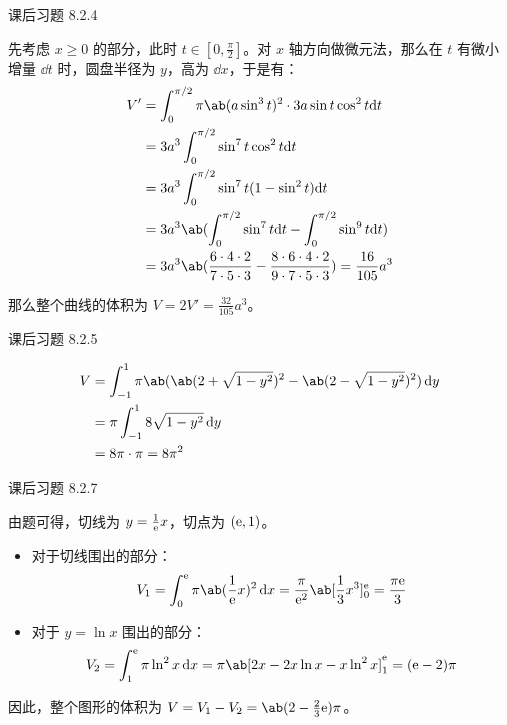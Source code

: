 \begin{problem}
	课后习题 8.2.4

	\begin{solution}
		先考虑 $x \ge 0$ 的部分，此时 $t \in [0, \frac{\pi}{2}]$。对 $x$ 轴方向做微元法，那么在 $t$ 有微小增量 $\dd t$ 时，圆盘半径为 $y$，高为 $\dd x$，于是有：
		$$
		\begin{aligned}
			V' & = \int_0^{\pi/2} \pi \ab(a \sin^3 t)^2 \cdot 3a \sin t \cos^2 t \dd t \\
			& = 3a^3 \int_0^{\pi/2} \sin^7 t \cos^2 t \dd t \\
			& = 3a^3 \int_0^{\pi/2} \sin^7 t (1 - \sin^2 t) \dd t \\
			& = 3a^3 \ab(\int_0^{\pi/2} \sin^7 t \dd t - \int_0^{\pi/2} \sin^9 t \dd t) \\
			& = 3a^3 \ab(\frac{6 \cdot 4 \cdot 2}{7 \cdot 5 \cdot 3} - \frac{8 \cdot 6 \cdot 4 \cdot 2}{9 \cdot 7 \cdot 5 \cdot 3}) = \frac{16}{105} a^3
		\end{aligned}
		$$

		那么整个曲线的体积为 $V = 2V' = \frac{32}{105} a^3$。
	\end{solution}
\end{problem}

\begin{problem}
	课后习题 8.2.5

	\begin{solution}
		$$
		\begin{aligned}
			V & = \int_{-1}^1 \pi \ab(\ab(2 + \sqrt{1 - y^2})^2 - \ab(2 - \sqrt{1 - y^2})^2) \dd{y} \\
			& = \pi \int_{-1}^1 8 \sqrt{1 - y^2} \dd{y} \\
			& = 8 \pi \cdot \pi = 8\pi^2
		\end{aligned}
		$$
	\end{solution}
\end{problem}

\begin{problem}
	课后习题 8.2.7

	\begin{solution}
		由题可得，切线为 $y = \frac{1}{\mathrm{e}} x$，切点为 $(\mathrm{e}, 1)$。

		\begin{itemize}
			\item 对于切线围出的部分：
			$$
			V_1 = \int_0^\E \pi \ab(\frac{1}{\E} x)^2 \dd{x} = \frac{\pi}{\E^2} \ab[\frac{1}{3} x^3]_0^\E = \frac{\pi \E}{3}
			$$
			\item 对于 $y = \ln x$ 围出的部分：
			$$
			V_2 = \int_1^\E \pi \ln^2 x \dd{x} = \pi \ab[2x - 2x \ln x - x \ln^2 x]_1^\E = (\E - 2) \pi
			$$
		\end{itemize}
		
		因此，整个图形的体积为 $V = V_1 - V_2 = \ab(2 - \frac{2}{3} \E) \pi$。
	\end{solution}
\end{problem}

